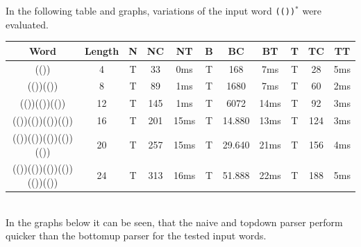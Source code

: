 \documentclass[a4paper, 11pt]{article}
\begin{document}
In the following table and graphs, variations of the input word \texttt{(())$^*$} were evaluated.

\begin{small}
\begin{tabular}{|c|c||c|c|c||c|c|c||c|c|c|}
\hline
Word & Length & N & NC & NT & B & BC & BT & T & TC & TT \\
\hline
\hline
(()) & 4 & T & 33 & 0ms & T & 168 & 7ms & T & 28 & 5ms \\
\hline
(())(()) & 8 & T & 89 & 1ms & T & 1680 & 7ms & T & 60 & 2ms \\
\hline
(())(())(()) & 12 & T & 145 & 1ms & T & 6072 & 14ms & T & 92 & 3ms \\
\hline
(())(())(())(()) & 16 & T & 201 & 15ms & T & 14.880 & 13ms & T & 124 & 3ms \\
\hline
(())(())(())(())(()) & 20 & T & 257 & 15ms & T & 29.640 & 21ms & T & 156 & 4ms \\
\hline
(())(())(())(())(())(()) & 24 & T & 313 & 16ms & T & 51.888 & 22ms & T & 188 & 5ms \\
\hline

\end{tabular}
\end{small}
\ \\


In the graphs below it can be seen, that the naive and topdown parser perform quicker than the bottomup parser for the tested input words.
\end{document}
